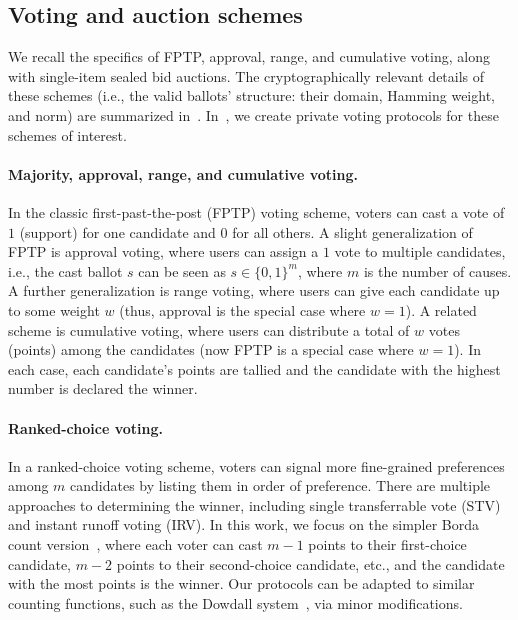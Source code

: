 \subsection{Voting and auction schemes}

We recall the specifics of FPTP, approval, range, and cumulative voting, along with single-item sealed bid auctions. The cryptographically relevant details of these schemes (i.e., the valid ballots' structure: their domain, Hamming weight, and norm) are summarized in~. In~, we create private voting protocols for these schemes of interest.



\paragraph{Majority, approval, range, and cumulative voting.} 
In the classic first-past-the-post (FPTP) voting scheme, voters can cast a vote of $1$ (support) for one candidate and $0$ for all others. A slight generalization of FPTP is approval voting, where users can assign a $1$ vote to multiple candidates, i.e., the cast ballot $s$ can be seen as $s\in\{0,1\}^{m}$, where $m$ is the number of causes. A further generalization is range voting, where users can give each candidate up to some weight $w$ (thus, approval is the special case where $w=1$). A related scheme is cumulative voting, where users can distribute a total of $w$ votes (points) among the candidates (now FPTP is a special case where $w=1$).
In each case, each candidate's points are tallied and the candidate with the highest number is declared the winner.

\paragraph{Ranked-choice voting.} 
In a ranked-choice voting scheme, voters can signal more fine-grained preferences among $m$ candidates by listing them in order of preference. There are multiple approaches to determining the winner, including single transferrable vote (STV) and instant runoff voting (IRV). In this work, we focus on the simpler Borda count version~\cite{Emerson13}, where each voter can cast $m-1$ points to their first-choice candidate, $m-2$ points to their second-choice candidate, etc., and the candidate with the most points is the winner. Our protocols can be adapted to similar counting functions, such as the Dowdall system~\cite{FraGro14}, via minor modifications.

